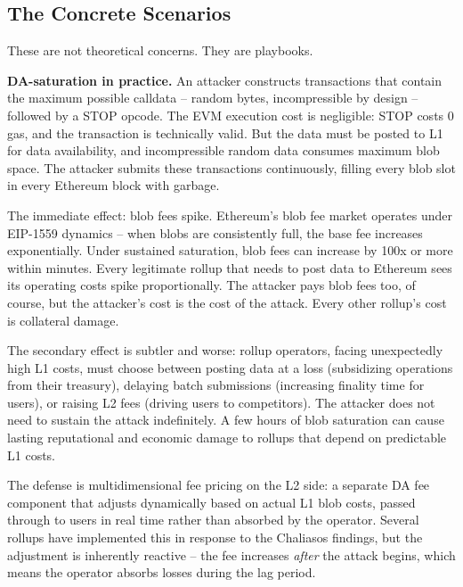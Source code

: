 \documentclass[
  11pt,
  openany]{report}
\renewcommand{\textbf}[1]{{\bfseries\color{MidnightBold}#1}}
\begin{document}
\subsection{The Concrete Scenarios}\label{the-concrete-scenarios}

These are not theoretical concerns. They are playbooks.

\textbf{DA-saturation in practice.} An attacker constructs transactions that
contain the maximum possible calldata -- random bytes, incompressible by design
-- followed by a STOP opcode. The EVM execution cost is negligible: STOP costs 0
gas, and the transaction is technically valid. But the data must be posted to L1
for data availability, and incompressible random data consumes maximum blob
space. The attacker submits these transactions continuously, filling every blob
slot in every Ethereum block with garbage.

The immediate effect: blob fees spike. Ethereum's blob fee market operates under
EIP-1559 dynamics -- when blobs are consistently full, the base fee increases
exponentially. Under sustained saturation, blob fees can increase by 100x or
more within minutes. Every legitimate rollup that needs to post data to Ethereum
sees its operating costs spike proportionally. The attacker pays blob fees too,
of course, but the attacker's cost is the cost of the attack. Every other
rollup's cost is collateral damage.

The secondary effect is subtler and worse: rollup operators, facing unexpectedly
high L1 costs, must choose between posting data at a loss (subsidizing
operations from their treasury), delaying batch submissions (increasing finality
time for users), or raising L2 fees (driving users to competitors). The attacker
does not need to sustain the attack indefinitely. A few hours of blob saturation
can cause lasting reputational and economic damage to rollups that depend on
predictable L1 costs.

The defense is multidimensional fee pricing on the L2 side: a separate DA fee
component that adjusts dynamically based on actual L1 blob costs, passed through
to users in real time rather than absorbed by the operator. Several rollups have
implemented this in response to the Chaliasos findings, but the adjustment is
inherently reactive -- the fee increases \emph{after} the attack begins, which
means the operator absorbs losses during the lag period.
\end{document}
